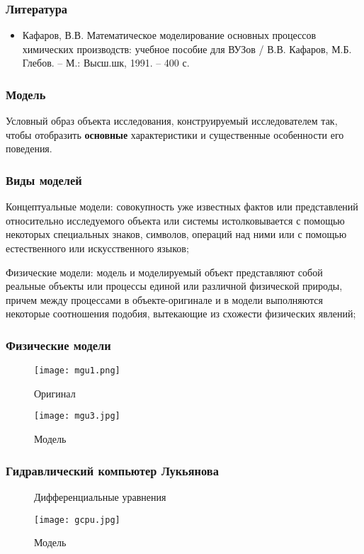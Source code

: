 \begin{frame}
	\frametitle{Литература}
	\begin{itemize}
		\item Кафаров, В.В. Математическое моделирование основных процессов химических производств: учебное пособие для ВУЗов / В.В. Кафаров, М.Б. Глебов. – М.: Высш.шк, 1991. – 400 с.
	\end{itemize}
\end{frame}

\begin{frame}
	\frametitle{Модель}
	Условный образ объекта исследования, конструируемый исследователем так, чтобы отобразить \textbf{основные} характеристики и существенные особенности его поведения.
\end{frame}

\begin{frame}
	\frametitle{Виды моделей}
	Концептуальные модели: 	совокупность уже известных фактов или представлений относительно исследуемого объекта или системы истолковывается с помощью некоторых специальных знаков, символов, операций над ними или с помощью естественного или искусственного языков;
	
	
	Физические модели: 	модель и моделируемый объект представляют собой реальные объекты или процессы единой или различной физической природы, причем между процессами в объекте-оригинале и в модели выполняются некоторые соотношения подобия, вытекающие из схожести физических явлений;
\end{frame}

\begin{frame}
	\frametitle{Физические модели}
	\begin{figure}
		\centering
		\begin{minipage}{0.45\textwidth}
			\centering
			\texttt{[image: mgu1.png]} %
			\caption{Оригинал}
		\end{minipage}\hfill
		\begin{minipage}{0.45\textwidth}
			\centering
			\texttt{[image: mgu3.jpg]} %
			\caption{Модель}
		\end{minipage}
	\end{figure}
\end{frame}


\begin{frame}
	\frametitle{Гидравлический компьютер Лукьянова}
	\begin{figure}
		\centering
		\begin{minipage}{0.45\textwidth}
			Дифференциальные уравнения
		\end{minipage}\hfill
		\begin{minipage}{0.45\textwidth}
			\centering
			\texttt{[image: gcpu.jpg]} %
			\caption{Модель}
		\end{minipage}
	\end{figure}
\end{frame}


